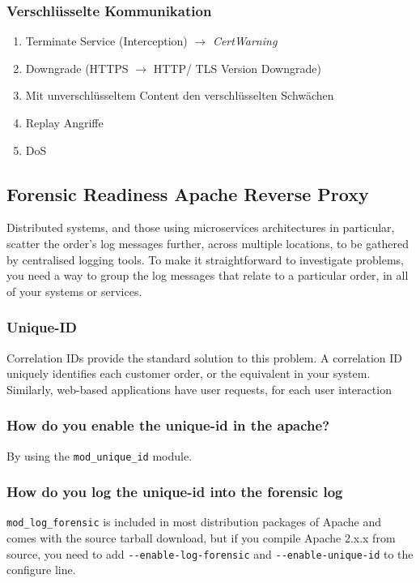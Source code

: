 \subsubsection{Verschlüsselte Kommunikation}
\begin{enumerate}
    \item Terminate Service (Interception) $\rightarrow$ \textit{CertWarning}
    \item Downgrade (HTTPS $\rightarrow$ HTTP/ TLS Version Downgrade)
    \item Mit unverschlüsseltem Content den verschlüsselten Schwächen
    \item Replay Angriffe
    \item DoS
\end{enumerate}

\subsection{Forensic Readiness Apache Reverse Proxy}
Distributed systems, and those using microservices architectures in particular, scatter the order's log messages further, across multiple locations, to be gathered by centralised logging tools. To make it straightforward to investigate problems, you need a way to group the log messages that relate to a particular order, in all of your systems or services.

\subsubsection{Unique-ID}
Correlation IDs provide the standard solution to this problem. A correlation ID uniquely identifies each \glqq customer order\grqq, or the equivalent in your system. Similarly, web-based applications have \glqq user requests\grqq, for each user interaction

\subsubsection{How do you enable the unique-id in the apache?}
By using the \lstinline|mod_unique_id| module.

\subsubsection{How do you log the unique-id into the forensic log}
\lstinline|mod_log_forensic| is included in most distribution packages of Apache and comes with the source tarball download, but if you compile Apache 2.x.x from source, you need to add \lstinline|--enable-log-forensic| and \lstinline|--enable-unique-id| to the configure line.

